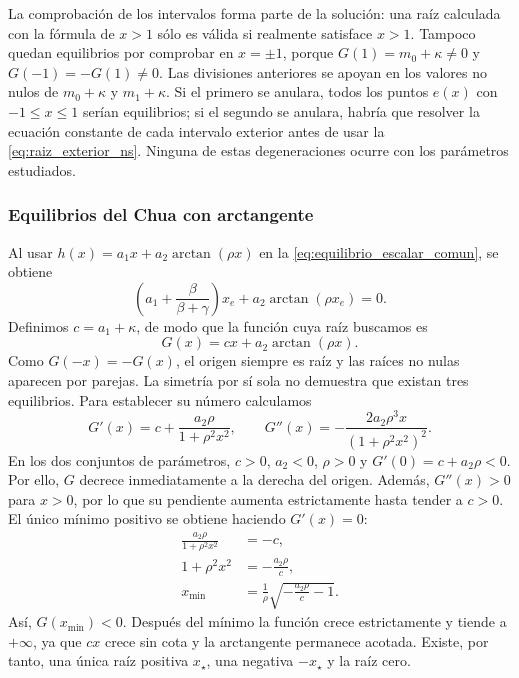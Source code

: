 La comprobación de los intervalos forma parte de la solución: una raíz
calculada con la fórmula de \(x>1\) sólo es válida si realmente satisface
\(x>1\). Tampoco quedan equilibrios por comprobar en \(x=\pm1\), porque
\(G(1)=m_0+\kappa\neq0\) y \(G(-1)=-G(1)\neq0\).
Las divisiones anteriores se apoyan en los valores no nulos de
\(m_0+\kappa\) y \(m_1+\kappa\). Si el primero se anulara, todos los puntos
\(e(x)\) con \(-1\leq x\leq1\) serían equilibrios; si el segundo se anulara,
habría que resolver la ecuación constante de cada intervalo exterior antes
de usar la \cref{eq:raiz_exterior_ns}. Ninguna de estas degeneraciones ocurre
con los parámetros estudiados.

\subsubsection{Equilibrios del Chua con arctangente}

Al usar
\(h(x)=a_1x+a_2\arctan(\rho x)\) en
la \cref{eq:equilibrio_escalar_comun}, se obtiene
\begin{equation}
\left(a_1+\frac{\beta}{\beta+\gamma}\right)x_e
+a_2\arctan(\rho x_e)=0.
\label{eq:equilibrio_escalar_arctan}
\end{equation}
Definimos \(c=a_1+\kappa\), de modo que la función cuya raíz buscamos es
\[
G(x)=cx+a_2\arctan(\rho x).
\]
Como \(G(-x)=-G(x)\), el origen siempre es raíz y las raíces no nulas
aparecen por parejas. La simetría por sí sola no demuestra que existan
tres equilibrios. Para establecer su número calculamos
\[
G'(x)=c+\frac{a_2\rho}{1+\rho^2x^2},
\qquad
G''(x)=-\frac{2a_2\rho^3x}{(1+\rho^2x^2)^2}.
\]
En los dos conjuntos de parámetros, \(c>0\), \(a_2<0\), \(\rho>0\) y
\(G'(0)=c+a_2\rho<0\). Por ello, \(G\) decrece inmediatamente a la derecha
del origen. Además, \(G''(x)>0\) para \(x>0\), por lo que su pendiente
aumenta estrictamente hasta tender a \(c>0\). El único mínimo positivo se
obtiene haciendo \(G'(x)=0\):
\begin{align*}
\frac{a_2\rho}{1+\rho^2x^2}&=-c,\\
1+\rho^2x^2&=-\frac{a_2\rho}{c},\\
x_{\min}&=\frac{1}{\rho}
\sqrt{-\frac{a_2\rho}{c}-1}.
\end{align*}
Así, \(G(x_{\min})<0\). Después del mínimo la función crece estrictamente y
tiende a \(+\infty\), ya que \(cx\) crece sin cota y la arctangente permanece
acotada. Existe, por tanto, una única raíz positiva \(x_\star\), una negativa
\(-x_\star\) y la raíz cero.

